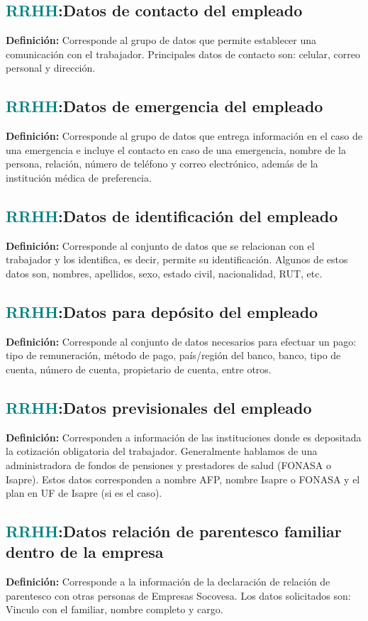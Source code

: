 \documentclass[12pt]{article}
\begin{document}
\subsection{\textcolor{teal}{RRHH}:{Datos de contacto del empleado}}
\textbf{Definición:} Corresponde al grupo de datos que permite establecer una comunicación con el trabajador. Principales datos de contacto son: celular, correo personal y dirección.
\subsection{\textcolor{teal}{RRHH}:{Datos de emergencia del empleado}}
\textbf{Definición:} Corresponde al grupo de datos que entrega información en el caso de una emergencia e incluye el contacto en caso de una emergencia, nombre de la persona, relación, número de teléfono y correo electrónico, además de la institución médica de preferencia.
\subsection{\textcolor{teal}{RRHH}:{Datos de identificación del empleado}}
\textbf{Definición:} Corresponde al conjunto de datos que se relacionan con el trabajador y los identifica, es decir, permite su identificación. Algunos de estos datos son, nombres, apellidos, sexo, estado civil, nacionalidad, RUT, etc.
\subsection{\textcolor{teal}{RRHH}:{Datos para depósito del empleado}}
\textbf{Definición:} Corresponde al conjunto de datos necesarios para efectuar un pago: tipo de remuneración, método de pago, país/región del banco, banco, tipo de cuenta, número de cuenta, propietario de cuenta, entre otros.
\subsection{\textcolor{teal}{RRHH}:{Datos previsionales del empleado}}
\textbf{Definición:} Corresponden a información de las instituciones donde es depositada la cotización obligatoria del trabajador. Generalmente hablamos de una administradora de fondos de pensiones y prestadores de salud (FONASA o Isapre). Estos datos corresponden a nombre AFP, nombre Isapre o FONASA y el plan en UF de Isapre (si es el caso).

\subsection{\textcolor{teal}{RRHH}:{Datos relación de parentesco familiar dentro de la empresa}}
\textbf{Definición:} Corresponde a la información de la declaración de relación de parentesco con otras personas de Empresas Socovesa. Los datos solicitados son: Vinculo con el familiar, nombre completo y cargo.
\end{document}
